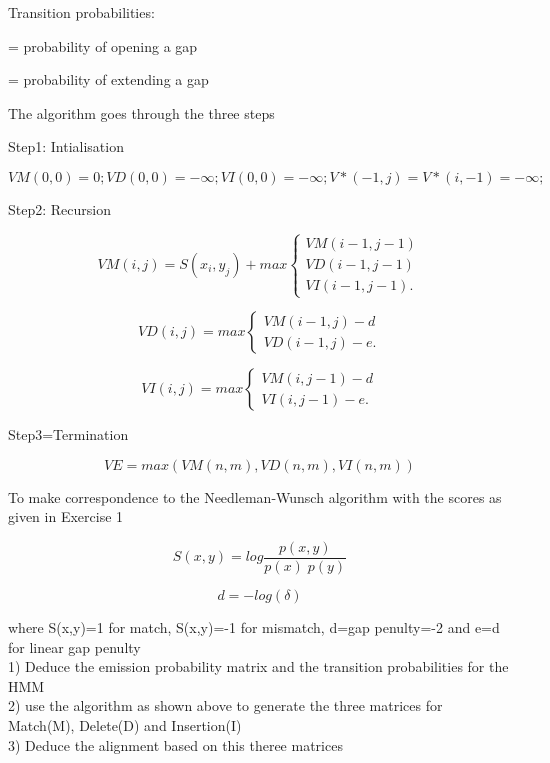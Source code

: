 \documentclass[a4paper,11pt]{article}
\DeclareRobustCommand{\greektext}{%
  \fontencoding{LGR}\selectfont\def\encodingdefault{LGR}}
\DeclareRobustCommand{\textgreek}[1]{\leavevmode{\greektext #1}}
\begin{document}
Transition probabilities:

\textgreek{d} = probability of opening a gap

\textgreek{e} = probability of extending a gap

The algorithm goes through the three steps


Step1: Intialisation




\[
VM(0,0)=0; VD(0,0)=-\infty ; VI(0,0)=-\infty;
V*(-1,j)=V*(i,-1)=-\infty;\]


Step2: Recursion

\[ VM(i,j) =S(x_{i},y_{j})+max \left\{ \begin{array}{ll}
	 VM(i-1,j-1)\\
         VD(i-1,j-1) \\
         VI(i-1,j-1)  .\end{array} \right. \] 

\[ VD(i,j) =max \left\{ \begin{array}{ll}
         VM(i-1,j)-d \\
         VD(i-1,j)-e  .\end{array} \right. \] 

\[ VI(i,j) =max \left\{ \begin{array}{ll}
         VM(i,j-1)-d \\
         VI(i,j-1)-e  .\end{array} \right. \]



Step3=Termination

\[ VE=max(VM(n,m),VD(n,m),VI(n,m))\]

   


To make correspondence to the Needleman-Wunsch algorithm with the scores as given in Exercise 1

\[
S(x,y)=log\frac{p(x,y)}{p(x)\; p(y)}\]

\[
d=-log(\delta)\]

where S(x,y)=1 for match, S(x,y)=-1 for mismatch, d=gap penulty=-2 and e=d for linear gap penulty\\

1) Deduce the emission probability matrix and the transition probabilities for the HMM \\
2) use the algorithm as shown above to generate the three matrices for Match(M), Delete(D) and Insertion(I)\\
3) Deduce the alignment based on this theree matrices
\end{document}
